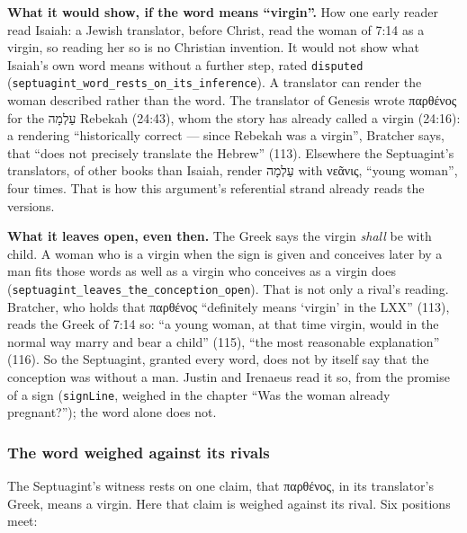 \documentclass[11pt]{article}
\begin{document}
\textbf{What it would show, if the word means “virgin”.} How one early reader read Isaiah: a Jewish translator, before Christ, read the woman of 7:14 as a virgin, so reading her so is no Christian invention. It would not show what Isaiah’s own word means without a further step, rated \texttt{disputed} (\texttt{septuagint\_\allowbreak{}word\_\allowbreak{}rests\_\allowbreak{}on\_\allowbreak{}its\_\allowbreak{}inference}). A translator can render the woman described rather than the word. The translator of Genesis wrote παρθένος for the עַלְמָה Rebekah (24:43), whom the story has already called a virgin (24:16): a rendering “historically correct — since Rebekah was a virgin”, Bratcher says, that “does not precisely translate the Hebrew” (113). Elsewhere the Septuagint’s translators, of other books than Isaiah, render עַלְמָה with νεᾶνις, “young woman”, four times. That is how this argument’s referential strand already reads the versions.

\textbf{What it leaves open, even then.} The Greek says the virgin \emph{shall} be with child. A woman who is a virgin when the sign is given and conceives later by a man fits those words as well as a virgin who conceives as a virgin does (\texttt{septuagint\_\allowbreak{}leaves\_\allowbreak{}the\_\allowbreak{}conception\_\allowbreak{}open}). That is not only a rival’s reading. Bratcher, who holds that παρθένος “definitely means ‘virgin’ in the LXX” (113), reads the Greek of 7:14 so: “a young woman, at that time virgin, would in the normal way marry and bear a child” (115), “the most reasonable explanation” (116). So the Septuagint, granted every word, does not by itself say that the conception was without a man. Justin and Irenaeus read it so, from the promise of a sign (\texttt{sign\allowbreak{}Line}, weighed in the chapter “Was the woman already pregnant?”); the word alone does not.

\subsubsection*{The word weighed against its rivals}
The Septuagint’s witness rests on one claim, that παρθένος, in its translator’s Greek, means a virgin. Here that claim is weighed against its rival. Six positions meet:
\end{document}
